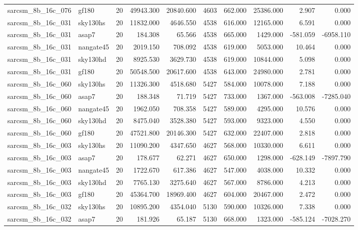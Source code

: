 \documentclass{article}
\begin{document}
\begin{longtable}{llrrrrrrrr}
sarcsm\_8b\_16c\_076 & gf180 & 20 & 49943.300 & 20840.600 & 4603 & 662.000 & 25386.000 & 2.907 & 0.000 \\
sarcsm\_8b\_16c\_031 & sky130hs & 20 & 11832.000 & 4646.550 & 4538 & 616.000 & 12165.000 & 6.591 & 0.000 \\
sarcsm\_8b\_16c\_031 & asap7 & 20 & 184.308 & 65.566 & 4538 & 665.000 & 1429.000 & -581.059 & -6958.110 \\
sarcsm\_8b\_16c\_031 & nangate45 & 20 & 2019.150 & 708.092 & 4538 & 619.000 & 5053.000 & 10.464 & 0.000 \\
sarcsm\_8b\_16c\_031 & sky130hd & 20 & 8925.530 & 3629.730 & 4538 & 619.000 & 10844.000 & 5.098 & 0.000 \\
sarcsm\_8b\_16c\_031 & gf180 & 20 & 50548.500 & 20617.600 & 4538 & 643.000 & 24980.000 & 2.781 & 0.000 \\
sarcsm\_8b\_16c\_060 & sky130hs & 20 & 11326.300 & 4518.680 & 5427 & 584.000 & 10078.000 & 7.188 & 0.000 \\
sarcsm\_8b\_16c\_060 & asap7 & 20 & 188.348 & 71.719 & 5427 & 733.000 & 1367.000 & -563.008 & -7285.040 \\
sarcsm\_8b\_16c\_060 & nangate45 & 20 & 1962.050 & 708.358 & 5427 & 589.000 & 4295.000 & 10.576 & 0.000 \\
sarcsm\_8b\_16c\_060 & sky130hd & 20 & 8475.040 & 3528.380 & 5427 & 593.000 & 9323.000 & 4.550 & 0.000 \\
sarcsm\_8b\_16c\_060 & gf180 & 20 & 47521.800 & 20146.300 & 5427 & 632.000 & 22407.000 & 2.818 & 0.000 \\
sarcsm\_8b\_16c\_003 & sky130hs & 20 & 11090.200 & 4347.650 & 4627 & 568.000 & 10330.000 & 6.611 & 0.000 \\
sarcsm\_8b\_16c\_003 & asap7 & 20 & 178.677 & 62.271 & 4627 & 650.000 & 1298.000 & -628.149 & -7897.790 \\
sarcsm\_8b\_16c\_003 & nangate45 & 20 & 1722.670 & 617.386 & 4627 & 547.000 & 4038.000 & 10.332 & 0.000 \\
sarcsm\_8b\_16c\_003 & sky130hd & 20 & 7765.130 & 3275.640 & 4627 & 567.000 & 8786.000 & 4.213 & 0.000 \\
sarcsm\_8b\_16c\_003 & gf180 & 20 & 45364.700 & 18969.400 & 4627 & 604.000 & 20467.000 & 2.472 & 0.000 \\
sarcsm\_8b\_16c\_032 & sky130hs & 20 & 10895.200 & 4354.040 & 5130 & 590.000 & 10326.000 & 7.338 & 0.000 \\
sarcsm\_8b\_16c\_032 & asap7 & 20 & 181.926 & 65.187 & 5130 & 668.000 & 1323.000 & -585.124 & -7028.270 \\

\end{longtable}
\end{document}

